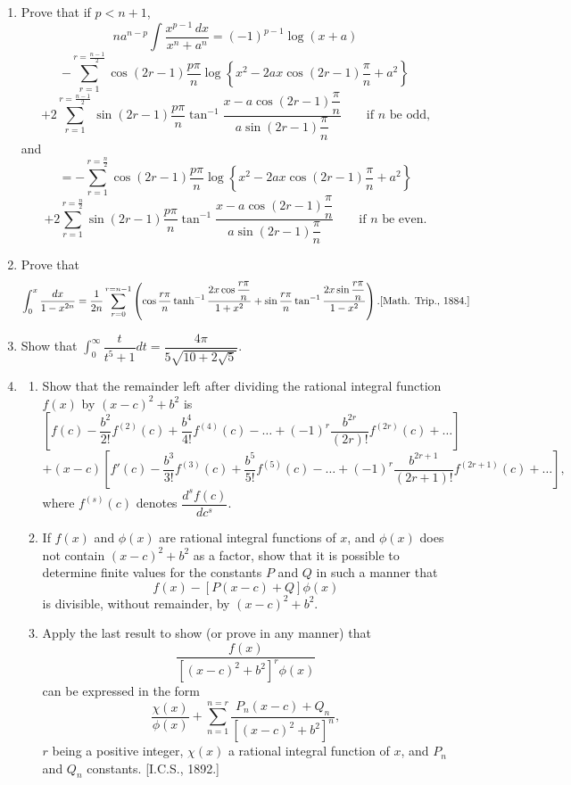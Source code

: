 \documentclass[11pt, a4paper]{article}
\newcommand{\source}[1]{\hfill\textnormal{[#1]}}
\begin{document}
\begin{enumerate}[leftmargin=2em]
\item Prove that if $p<n+1$,
\[
na^{n-p}\int \dfrac{x^{p-1}\,dx}{x^n+a^n} = (-1)^{p-1}\log(x+a)
\]
\[
-\sum_{r=1}^{r=\frac{n-1}{2}}\cos(2r-1)\dfrac{p\pi}{n}\log\left\{x^2-2ax\cos(2r-1)\dfrac{\pi}{n}+a^2\right\}
\]
\[
+2\sum_{r=1}^{r=\frac{n-1}{2}}\sin(2r-1)\dfrac{p\pi}{n}\tan^{-1}\dfrac{x-a\cos(2r-1)\dfrac{\pi}{n}}{a\sin(2r-1)\dfrac{\pi}{n}}\qquad\text{if $n$ be odd,}
\]
and
\[
=-\sum_{r=1}^{r=\frac{n}{2}}\cos(2r-1)\dfrac{p\pi}{n}\log\left\{x^2-2ax\cos(2r-1)\dfrac{\pi}{n}+a^2\right\}
\]
\[
+2\sum_{r=1}^{r=\frac{n}{2}}\sin(2r-1)\dfrac{p\pi}{n}\tan^{-1}\dfrac{x-a\cos(2r-1)\dfrac{\pi}{n}}{a\sin(2r-1)\dfrac{\pi}{n}}\qquad\text{if $n$ be even.}
\]

\item Prove that
\[
\int_0^x \dfrac{dx}{1-x^{2n}} = \dfrac{1}{2n}\sum_{r=0}^{r=n-1}\left(\cos\dfrac{r\pi}{n}\tanh^{-1}\dfrac{2x\cos\dfrac{r\pi}{n}}{1+x^2}+\sin\dfrac{r\pi}{n}\tan^{-1}\dfrac{2x\sin\dfrac{r\pi}{n}}{1-x^2}\right). \source{Math. Trip., 1884.}
\]

\item Show that $\displaystyle\int_0^\infty \dfrac{t}{t^5+1}dt = \dfrac{4\pi}{5\sqrt{10+2\sqrt5}}$.

\item
\begin{enumerate}[label=(\roman*)]
\item Show that the remainder left after dividing the rational integral function $f(x)$ by $(x-c)^2+b^2$ is
\[
\left[f(c)-\dfrac{b^2}{2!}f^{(2)}(c)+\dfrac{b^4}{4!}f^{(4)}(c)-\dots+(-1)^r\dfrac{b^{2r}}{(2r)!}f^{(2r)}(c)+\dots\right]
\]
\[
+(x-c)\left[f'(c)-\dfrac{b^3}{3!}f^{(3)}(c)+\dfrac{b^5}{5!}f^{(5)}(c)-\dots+(-1)^r\dfrac{b^{2r+1}}{(2r+1)!}f^{(2r+1)}(c)+\dots\right],
\]
where $f^{(s)}(c)$ denotes $\dfrac{d^sf(c)}{dc^s}$.
\item If $f(x)$ and $\phi(x)$ are rational integral functions of $x$, and $\phi(x)$ does not contain $(x-c)^2+b^2$ as a factor, show that it is possible to determine finite values for the constants $P$ and $Q$ in such a manner that
\[
f(x)-[P(x-c)+Q]\phi(x)
\]
is divisible, without remainder, by $(x-c)^2+b^2$.
\item Apply the last result to show (or prove in any manner) that
\[
\dfrac{f(x)}{[(x-c)^2+b^2]^r\phi(x)}
\]
can be expressed in the form
\[
\dfrac{\chi(x)}{\phi(x)}+\sum_{n=1}^{n=r}\dfrac{P_n(x-c)+Q_n}{[(x-c)^2+b^2]^n},
\]
$r$ being a positive integer, $\chi(x)$ a rational integral function of $x$, and $P_n$ and $Q_n$ constants. \source{I.C.S., 1892.}
\end{enumerate}


\end{enumerate}
\end{document}
